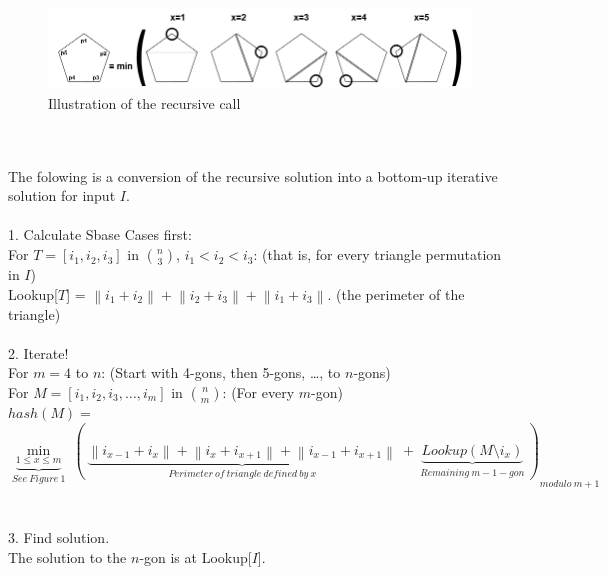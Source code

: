 \documentclass[10pt]{article}
\newcommand{\tab}{\hspace*{2em}}
\newcommand{\tabb}{\hspace*{4em}}
\newcommand{\tabbb}{\hspace*{6em}}
\begin{document}
				\begin{figure}[h]
					\centering
						\includegraphics[width=450px]{dynamic7r.png}
					\caption{Illustration of the recursive call}
				\end{figure}\\
				\\
				The folowing is a conversion of the recursive solution into a bottom-up iterative solution for input $I$.\\
				\\
				1. Calculate Sbase Cases first:\\
				\tab For $T = [i_1, i_2, i_3]$ in $n \choose 3$, $i_1 < i_2 < i_3$: (that is, for every triangle permutation in $I$)\\
				\tabb Lookup[$T$] = $\left\|i_1+i_2\right\|+\left\|i_2+i_3\right\|+\left\|i_1+i_3\right\|$. (the perimeter of the triangle)\\
				\\
				2. Iterate!\\
				\tab For $m = 4$ to $n$: (Start with 4-gons, then 5-gons, \ldots, to $n$-gons)\\
				\tabb For $M = [i_1, i_2, i_3, \ldots, i_m]$ in $n \choose m$: (For every $m$-gon)\\
				\tabbb $hash(M) =$
				\[{\underbrace{\min_{1 \leq x \leq m}}_{See~Figure~1}~(~
					\underbrace{\left\|i_{x-1}+i_x\right\|+\left\|i_x+i_{x+1}\right\|+\left\|i_{x-1}+i_{x+1}\right\|}_{Perimeter~of~triangle~defined~by~x}
					~+~
					\underbrace{Lookup(M \setminus i_{x})}_{Remaining~m-1-gon}~)
					}_{modulo~m+1}\]\\
				\\
				3. Find solution.\\
				\tab The solution to the $n$-gon is at Lookup[$I$].
				
\end{document}
